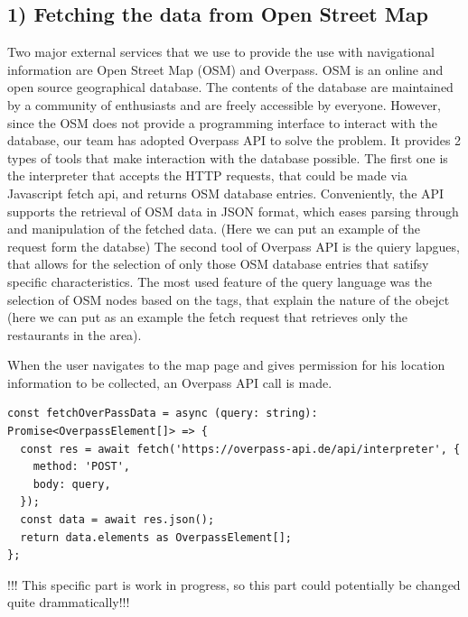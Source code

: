 \subsection{1) Fetching the data from Open Street Map }
Two major external services that we use to provide the use with navigational information are Open Street Map (OSM) and Overpass. OSM is an online and open source geographical database. The contents of the database are maintained by a community of enthusiasts and are freely accessible by everyone. However,  since the OSM does not provide a programming interface to interact with the database, our team has adopted Overpass API to solve the problem. It provides 2 types of tools that make interaction with the database possible. The first one is the interpreter that accepts the HTTP requests, that could be made via Javascript fetch api, and returns OSM database entries. Conveniently, the API supports the retrieval of OSM data in JSON format, which eases parsing through and manipulation of the fetched data. (Here we can put an example of the request form the databse) The second tool of Overpass API is the quiery lapgues, that allows for the selection of only those OSM database entries that satifsy specific characteristics. The most used feature of the query language was the selection of OSM nodes based on the tags, that explain the nature of the obejct (here we can put as an example the fetch request that retrieves only the restaurants in the area). 

When the user navigates to the map page and gives permission for his location information to be collected, an Overpass API call is made.
\begin{verbatim} 
const fetchOverPassData = async (query: string): Promise<OverpassElement[]> => {
  const res = await fetch('https://overpass-api.de/api/interpreter', {
    method: 'POST',
    body: query,
  });
  const data = await res.json();
  return data.elements as OverpassElement[];
};
\end{verbatim}
!!! This specific part is work in progress, so this part could potentially be changed quite drammatically!!!

